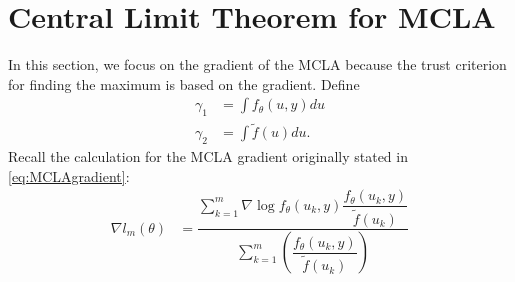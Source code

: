 \documentclass{article}
\begin{document}
\section{Central Limit Theorem for MCLA}\label{sec:CLT}
In this section, we focus on the gradient of the MCLA because the trust criterion for finding the maximum is based on the gradient.
Define
\begin{align}
\gamma_1&= \int f_\theta(u,y) du\\
\gamma_2 &=\int \tilde{f}(u)du.
\end{align}
Recall the calculation for the MCLA gradient originally stated in  \eqref{eq:MCLAgradient}:
\begin{align}
\nabla l_m(\theta)&= \dfrac{\sum_{k=1}^m     \nabla \log f_\theta(u_k,y)  \dfrac{f_\theta(u_k,y)}{\tilde{f}(u_k)} }{\sum_{k=1}^m \left( \dfrac{f_\theta(u_k,y)}{\tilde{f}(u_k)} \right) }
\end{align}
\end{document}
